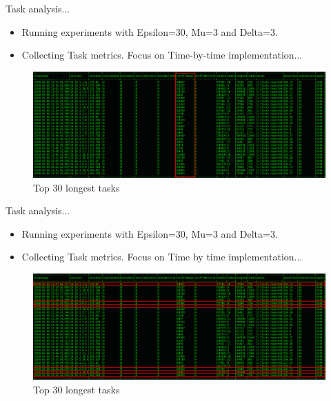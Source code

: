 \documentclass{beamer}
\begin{document}
\begin{frame}{Task analysis...}
    \begin{itemize}
        \item Running experiments with Epsilon=30, Mu=3 and Delta=3.
        \item Collecting Task metrics.  Focus on Time-by-time implementation...
    \end{itemize}
    \begin{figure}
        \includegraphics[width=1\textwidth]{figures/TaskAnalysisFF1}
        \caption{\small Top 30 longest tasks}
    \end{figure}
\end{frame}

\begin{frame}{Task analysis...}
    \begin{itemize}
        \item Running experiments with Epsilon=30, Mu=3 and Delta=3.
        \item Collecting Task metrics.  Focus on Time by time implementation...
    \end{itemize}
    \begin{figure}
        \includegraphics[width=1\textwidth]{figures/TaskAnalysisFF2}
        \caption{\small Top 30 longest tasks}
    \end{figure}
\end{frame}
\end{document}
